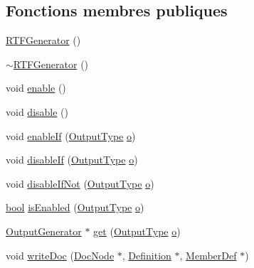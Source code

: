 \subsection*{Fonctions membres publiques}
\begin{DoxyCompactItemize}
\item 
\hyperlink{class_r_t_f_generator_ad19e0af9634ae061da9492887d9770bd}{R\+T\+F\+Generator} ()
\item 
\hyperlink{class_r_t_f_generator_acb099d4774cb45b57ccc748e081e48cf}{$\sim$\+R\+T\+F\+Generator} ()
\item 
void \hyperlink{class_r_t_f_generator_adc782b62f471353f7b535052bd8e16c1}{enable} ()
\item 
void \hyperlink{class_r_t_f_generator_aae28ca70077d65fd1b3dcd9ec9781e05}{disable} ()
\item 
void \hyperlink{class_r_t_f_generator_a21f14b800414d41657e55e6e57fc66ef}{enable\+If} (\hyperlink{class_output_generator_ab79b5d3c19d95c8a5929c07f5b2918cf}{Output\+Type} \hyperlink{060__command__switch_8tcl_a495e7a4ede0831107e9d435080a7c268}{o})
\item 
void \hyperlink{class_r_t_f_generator_a35fbaedd73a1f52ea24a04199d8f415c}{disable\+If} (\hyperlink{class_output_generator_ab79b5d3c19d95c8a5929c07f5b2918cf}{Output\+Type} \hyperlink{060__command__switch_8tcl_a495e7a4ede0831107e9d435080a7c268}{o})
\item 
void \hyperlink{class_r_t_f_generator_a1c9164aa856f5977128a8253a1f64426}{disable\+If\+Not} (\hyperlink{class_output_generator_ab79b5d3c19d95c8a5929c07f5b2918cf}{Output\+Type} \hyperlink{060__command__switch_8tcl_a495e7a4ede0831107e9d435080a7c268}{o})
\item 
\hyperlink{qglobal_8h_a1062901a7428fdd9c7f180f5e01ea056}{bool} \hyperlink{class_r_t_f_generator_a6bccbf01f966c68264db6a07ec459cb0}{is\+Enabled} (\hyperlink{class_output_generator_ab79b5d3c19d95c8a5929c07f5b2918cf}{Output\+Type} \hyperlink{060__command__switch_8tcl_a495e7a4ede0831107e9d435080a7c268}{o})
\item 
\hyperlink{class_output_generator}{Output\+Generator} $\ast$ \hyperlink{class_r_t_f_generator_a24e81556aafd0e14948cd96f1dbefc46}{get} (\hyperlink{class_output_generator_ab79b5d3c19d95c8a5929c07f5b2918cf}{Output\+Type} \hyperlink{060__command__switch_8tcl_a495e7a4ede0831107e9d435080a7c268}{o})
\item 
void \hyperlink{class_r_t_f_generator_a0d8c73e39b915db738f68dddaf437370}{write\+Doc} (\hyperlink{class_doc_node}{Doc\+Node} $\ast$, \hyperlink{class_definition}{Definition} $\ast$, \hyperlink{class_member_def}{Member\+Def} $\ast$)

\end{DoxyCompactItemize}
